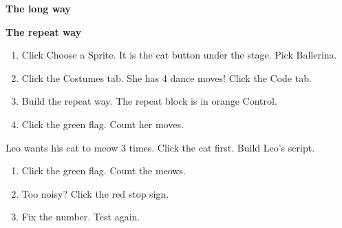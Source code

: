 \begin{center}
\begin{minipage}[t]{0.45\linewidth}\centering
\textbf{The long way}\par\medskip
\begin{scratch}[scale=0.65]
\end{scratch}
\end{minipage}\hfill
\begin{minipage}[t]{0.45\linewidth}\centering
\textbf{The repeat way}\par\medskip
\begin{scratch}[scale=0.65]
\end{scratch}
\end{minipage}
\end{center}

\begin{exercise}
\begin{enumerate}[leftmargin=1.4em,itemsep=2pt]
  \item Click Choose a Sprite. It is the cat button under the stage. Pick Ballerina.
  \item Click the Costumes tab. She has 4 dance moves! Click the Code tab.
  \item Build the repeat way. The repeat block is in orange Control.
  \item Click the green flag. Count her moves.
\end{enumerate}
\end{exercise}

\begin{exercise}
Leo wants his cat to meow 3 times. Click the cat first. Build Leo's script.
\begin{center}
\begin{scratch}[scale=0.9]
\end{scratch}
\end{center}
\begin{enumerate}[leftmargin=1.4em,itemsep=2pt]
  \item Click the green flag. Count the meows.
  \item Too noisy? Click the red stop sign.
  \item Fix the number. Test again.
\end{enumerate}
\end{exercise}


